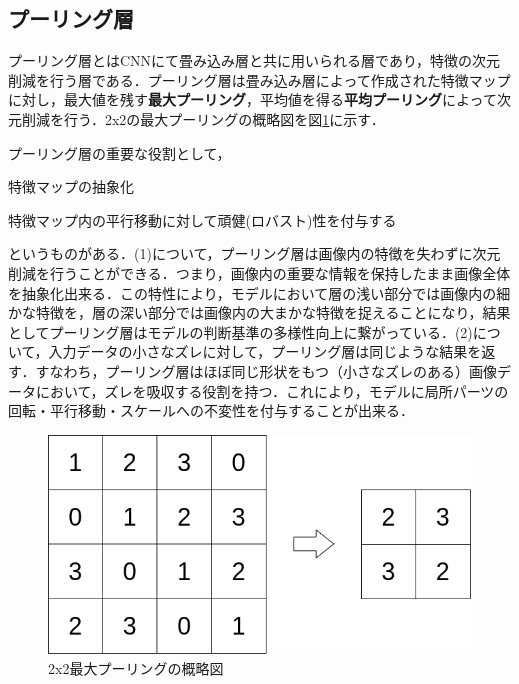 \documentclass[a4j, 11pt]{jreport}
\begin{document}
\subsection{プーリング層}
プーリング層とはCNNにて畳み込み層と共に用いられる層であり，特徴の次元削減を行う層である．プーリング層は畳み込み層によって作成された特徴マップに対し，最大値を残す\textbf{最大プーリング}，平均値を得る\textbf{平均プーリング}によって次元削減を行う．2x2の最大プーリングの概略図を図\ref{fig:maxpooling}に示す．

プーリング層の重要な役割として，
\begin{inparaenum}[(1)]
 \item 特徴マップの抽象化
 \item 特徴マップ内の平行移動に対して頑健(ロバスト)性を付与する
\end{inparaenum}
というものがある．(1)について，プーリング層は画像内の特徴を失わずに次元削減を行うことができる．つまり，画像内の重要な情報を保持したまま画像全体を抽象化出来る．この特性により，モデルにおいて層の浅い部分では画像内の細かな特徴を，層の深い部分では画像内の大まかな特徴を捉えることになり，結果としてプーリング層はモデルの判断基準の多様性向上に繋がっている．(2)について，入力データの小さなズレに対して，プーリング層は同じような結果を返す．すなわち，プーリング層はほぼ同じ形状をもつ（小さなズレのある）画像データにおいて，ズレを吸収する役割を持つ．これにより，モデルに局所パーツの回転・平行移動・スケールへの不変性を付与することが出来る．

\begin{figure}[H]
 \centering
 \includegraphics[width=0.8\hsize, keepaspectratio]{images/drawio/maxpooling.png}
 \caption{2x2最大プーリングの概略図}
 \label{fig:maxpooling}
\end{figure}
\end{document}
